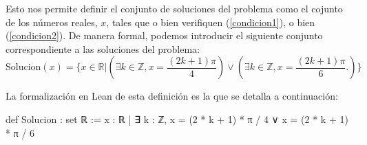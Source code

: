 Esto nos permite definir el conjunto de soluciones del problema
como el cojunto de los números reales, \(x\), tales que o bien
verifiquen (\ref{condicion1}), o bien (\ref{condicion2}). De
manera formal, podemos introducir el siguiente conjunto
correspondiente a las soluciones del problema:
\begin{equation}
  \text{Solucion}(x)=\{x∈ ℝ | (∃k∈ℤ, x= \frac{(2k+1)π}{4})
  \lor (∃k∈ℤ, x=\frac{(2k+1)π}{6}.) \}
\end{equation}

La formalización en Lean de esta definición es la que se detalla
a continuación:
\begin{leancode}
  def Solucion : set ℝ :={ x : ℝ | ∃ k : ℤ,
    x = (2 * k + 1) * π / 4 ∨ x = (2 * k + 1) * π / 6 }
\end{leancode}